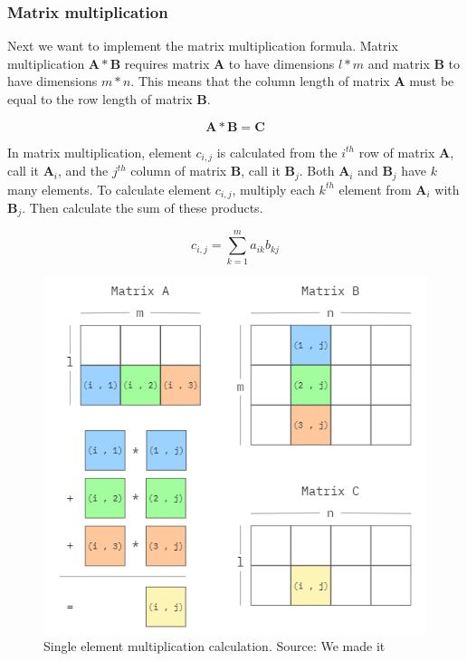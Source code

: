\subsubsection{Matrix multiplication}

Next we want to implement the matrix multiplication formula. Matrix multiplication \(\mathbf{A} * \mathbf{B}\) requires matrix \(\mathbf{A}\) to have dimensions \(l * m\) and matrix \(\mathbf{B}\) to have dimensions \(m * n\). This means that the column length of matrix \(\mathbf{A}\) must be equal to the row length of matrix \(\mathbf{B}\).

\[\mathbf{A} * \mathbf{B} = \mathbf{C}\]

In matrix multiplication, element \(c_{i,j}\) is calculated from the $i^{th}$ row of matrix \(\mathbf{A}\), call it \(\mathbf{A}_{i}\), and the $j^{th}$ column of matrix \(\mathbf{B}\), call it \(\mathbf{B}_{j}\). Both \(\mathbf{A}_{i}\) and \(\mathbf{B}_{j}\) have $k$ many elements. To calculate element \(c_{i,j}\), multiply each $k^{th}$ element from \(\mathbf{A}_{i}\) with \(\mathbf{B}_{j}\). Then calculate the sum of these products.

\[c_{i,j} = \sum_{k=1}^m a_{ik} b_{kj}\]

\begin{figure}[H]
\includegraphics[scale=.65]{Documents/Report/Figures/MatrixMultiplication.png}
\centering
\caption{Single element multiplication calculation. Source: We made it}
\label{fig:multiplication_illustration}
\end{figure}

